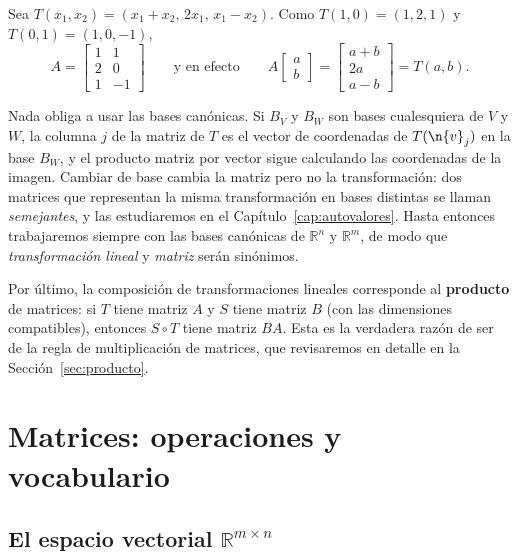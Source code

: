 \begin{example}
Sea $T(x_1, x_2) = (x_1 + x_2,\, 2x_1,\, x_1 - x_2)$. Como $T(1,0) = (1,2,1)$ y
$T(0,1) = (1,0,-1)$,
\[
A = \begin{bmatrix} 1 & 1 \\ 2 & 0 \\ 1 & -1 \end{bmatrix}
\qquad\text{y en efecto}\qquad
A \begin{bmatrix} a \\ b \end{bmatrix}
= \begin{bmatrix} a + b \\ 2a \\ a - b \end{bmatrix} = T(a,b).
\]
\end{example}

\begin{remark}\label{obs:otras-bases}
Nada obliga a usar las bases canónicas. Si $B_V$ y $B_W$ son bases cualesquiera
de $V$ y $W$, la columna $j$ de la matriz de $T$ es el vector de coordenadas de
$T(\n{v}_j)$ en la base $B_W$, y el producto matriz por vector sigue calculando
las coordenadas de la imagen. Cambiar de base cambia la matriz pero no la
transformación: dos matrices que representan la misma transformación en bases
distintas se llaman \emph{semejantes}, y las estudiaremos en el
Capítulo~\ref{cap:autovalores}. Hasta entonces trabajaremos siempre con las
bases canónicas de $\mathbb{R}^n$ y $\mathbb{R}^m$, de modo que
\emph{transformación lineal} y \emph{matriz} serán sinónimos.
\end{remark}

Por último, la composición de transformaciones lineales corresponde al
\textbf{producto} de matrices: si $T$ tiene matriz $A$ y $S$ tiene matriz $B$
(con las dimensiones compatibles), entonces $S\circ T$ tiene matriz $BA$. Esta
es la verdadera razón de ser de la regla de multiplicación de matrices, que
revisaremos en detalle en la Sección~\ref{sec:producto}.

\section{Matrices: operaciones y vocabulario}
\label{sec:vocabulario}

\subsection{El espacio vectorial $\mathbb{R}^{m\times n}$}

